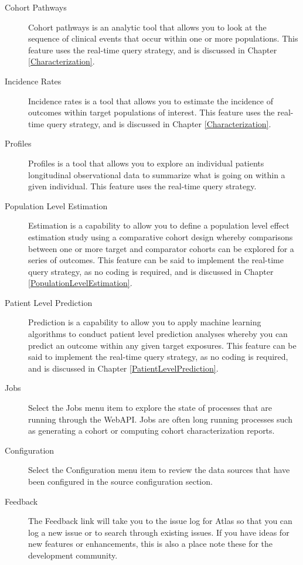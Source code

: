 \documentclass[11pt]{book}
\theoremstyle{definition}
\theoremstyle{definition}
\theoremstyle{definition}
\theoremstyle{remark}
\begin{document}
\begin{description}
\item[Cohort Pathways ]
Cohort pathways is an analytic tool that allows you to look at the
sequence of clinical events that occur within one or more populations.
This feature uses the real-time query strategy, and is discussed in
Chapter \ref{Characterization}.
\item[Incidence Rates ]
Incidence rates is a tool that allows you to estimate the incidence of
outcomes within target populations of interest. This feature uses the
real-time query strategy, and is discussed in Chapter
\ref{Characterization}.
\item[Profiles ]
Profiles is a tool that allows you to explore an individual patients
longitudinal observational data to summarize what is going on within a
given individual. This feature uses the real-time query strategy.
\item[Population Level Estimation
]
Estimation is a capability to allow you to define a population level
effect estimation study using a comparative cohort design whereby
comparisons between one or more target and comparator cohorts can be
explored for a series of outcomes. This feature can be said to implement
the real-time query strategy, as no coding is required, and is discussed
in Chapter \ref{PopulationLevelEstimation}.
\item[Patient Level Prediction ]
Prediction is a capability to allow you to apply machine learning
algorithms to conduct patient level prediction analyses whereby you can
predict an outcome within any given target exposures. This feature can
be said to implement the real-time query strategy, as no coding is
required, and is discussed in Chapter \ref{PatientLevelPrediction}.
\item[Jobs ]
Select the Jobs menu item to explore the state of processes that are
running through the WebAPI. Jobs are often long running processes such
as generating a cohort or computing cohort characterization reports.
\item[Configuration ]
Select the Configuration menu item to review the data sources that have
been configured in the source configuration section.
\item[Feedback ]
The Feedback link will take you to the issue log for Atlas so that you
can log a new issue or to search through existing issues. If you have
ideas for new features or enhancements, this is also a place note these
for the development community.
\end{description}
\end{document}
